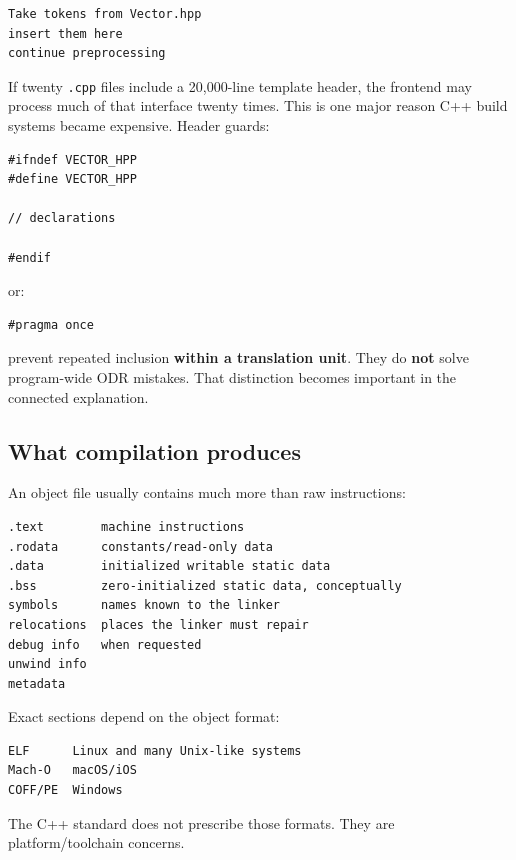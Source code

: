 \begin{verbatim}
Take tokens from Vector.hpp
insert them here
continue preprocessing
\end{verbatim}

If twenty \texttt{.cpp} files include a 20,000-line template header, the frontend may process much of that interface twenty times. This is one major reason C++ build systems became expensive. Header guards:

\begin{verbatim}
#ifndef VECTOR_HPP
#define VECTOR_HPP

// declarations

#endif
\end{verbatim}

or:

\begin{verbatim}
#pragma once
\end{verbatim}

prevent repeated inclusion \textbf{within a translation unit}. They do \textbf{not} solve program-wide ODR mistakes. That distinction becomes important in the connected explanation.

\subsection{What compilation produces}\label{05-engine-i-ch002-what-compilation-produces}

\hypertarget{05-engine-i-ch002-what-compilation-produces}{}

An object file usually contains much more than raw instructions:

\begin{verbatim}
.text        machine instructions
.rodata      constants/read-only data
.data        initialized writable static data
.bss         zero-initialized static data, conceptually
symbols      names known to the linker
relocations  places the linker must repair
debug info   when requested
unwind info
metadata
\end{verbatim}

Exact sections depend on the object format:

\begin{verbatim}
ELF      Linux and many Unix-like systems
Mach-O   macOS/iOS
COFF/PE  Windows
\end{verbatim}

The C++ standard does not prescribe those formats. They are platform/toolchain concerns.

